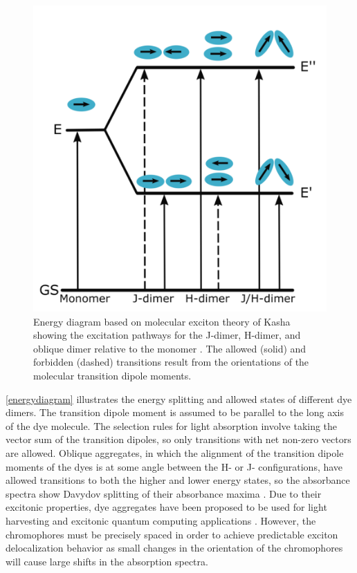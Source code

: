 \begin{figure}[h!]
    \centering
    \includegraphics[width=0.8\linewidth]{figures/pub1/energy-diagram.pdf}
    \caption[Energy diagram based on molecular exciton theory of Kasha showing the excitation pathways for the J-dimer, H-dimer, and oblique dimer relative to the monomer. The allowed (solid) and forbidden (dashed) transitions result from the orientations of the molecular transition dipole moments.]{Energy diagram based on molecular exciton theory of Kasha showing the excitation pathways for the J-dimer, H-dimer, and oblique dimer relative to the monomer \cite{Wurthner2011}. The allowed (solid) and forbidden (dashed) transitions result from the orientations of the molecular transition dipole moments.}\label{energydiagram}
\end{figure}
\autoref{energydiagram} illustrates the energy splitting and allowed states of different dye dimers. The transition dipole moment is assumed to be parallel to the long axis of the dye molecule. The selection rules for light absorption involve taking the vector sum of the transition dipoles, so only transitions with net non-zero vectors are allowed. Oblique aggregates, in which the alignment of the transition dipole moments of the dyes is at some angle between the H- or J- configurations, have allowed transitions to both the higher and lower energy states, so the absorbance spectra show Davydov splitting of their absorbance maxima \cite{Davydov1964}. Due to their excitonic properties, dye aggregates have been proposed to be used for light harvesting and excitonic quantum computing applications \cite{Scholes2012a, Scholes2011b, Scholes2011a, Romero2017a}. However, the chromophores must be precisely spaced in order to achieve predictable exciton delocalization behavior as small changes in the orientation of the chromophores will cause large shifts in the absorption spectra.


